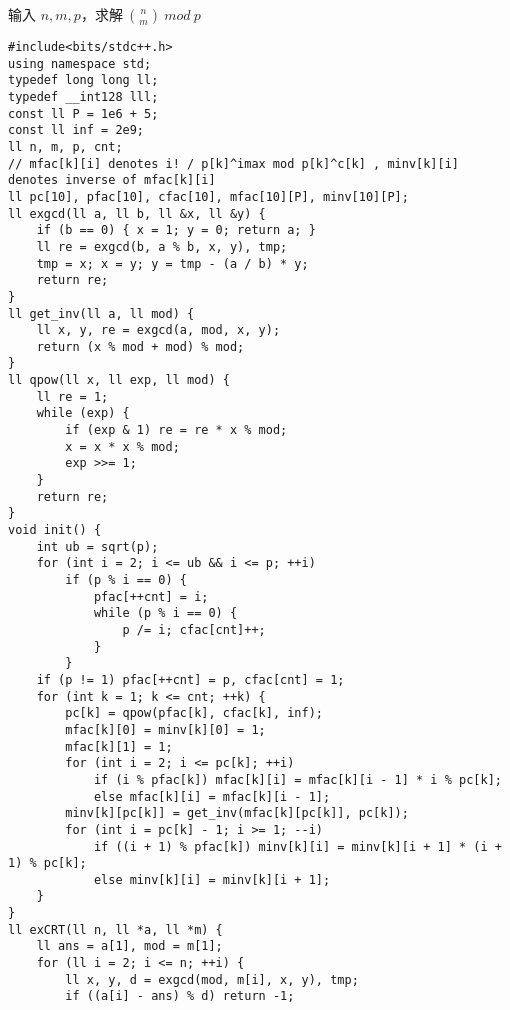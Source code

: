 \par \noindent 输入 $n,m,p$，求解$\ \binom n m \ mod \ p$
\begin{verbatim}
#include<bits/stdc++.h>
using namespace std;
typedef long long ll;
typedef __int128 lll;
const ll P = 1e6 + 5;
const ll inf = 2e9;
ll n, m, p, cnt;
// mfac[k][i] denotes i! / p[k]^imax mod p[k]^c[k] , minv[k][i] denotes inverse of mfac[k][i]
ll pc[10], pfac[10], cfac[10], mfac[10][P], minv[10][P];
ll exgcd(ll a, ll b, ll &x, ll &y) {
    if (b == 0) { x = 1; y = 0; return a; }
    ll re = exgcd(b, a % b, x, y), tmp;
    tmp = x; x = y; y = tmp - (a / b) * y;
    return re;
}
ll get_inv(ll a, ll mod) {
    ll x, y, re = exgcd(a, mod, x, y);
    return (x % mod + mod) % mod;
}
ll qpow(ll x, ll exp, ll mod) {
    ll re = 1;
    while (exp) {
        if (exp & 1) re = re * x % mod;
        x = x * x % mod;
        exp >>= 1;
    }
    return re;
}
void init() {
    int ub = sqrt(p);
    for (int i = 2; i <= ub && i <= p; ++i)
        if (p % i == 0) {
            pfac[++cnt] = i;
            while (p % i == 0) {
                p /= i; cfac[cnt]++;
            }
        }
    if (p != 1) pfac[++cnt] = p, cfac[cnt] = 1;
    for (int k = 1; k <= cnt; ++k) {
        pc[k] = qpow(pfac[k], cfac[k], inf);
        mfac[k][0] = minv[k][0] = 1;
        mfac[k][1] = 1;
        for (int i = 2; i <= pc[k]; ++i)
            if (i % pfac[k]) mfac[k][i] = mfac[k][i - 1] * i % pc[k];
            else mfac[k][i] = mfac[k][i - 1];
        minv[k][pc[k]] = get_inv(mfac[k][pc[k]], pc[k]);
        for (int i = pc[k] - 1; i >= 1; --i)
            if ((i + 1) % pfac[k]) minv[k][i] = minv[k][i + 1] * (i + 1) % pc[k];
            else minv[k][i] = minv[k][i + 1];
    }
}
ll exCRT(ll n, ll *a, ll *m) {
    ll ans = a[1], mod = m[1];
    for (ll i = 2; i <= n; ++i) {
        ll x, y, d = exgcd(mod, m[i], x, y), tmp;
        if ((a[i] - ans) % d) return -1;


\end{verbatim}
